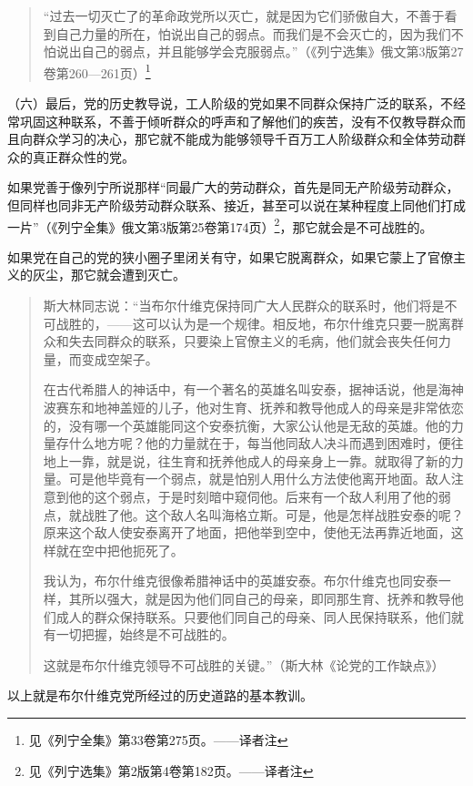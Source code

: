 \begin{quotation}
“过去一切灭亡了的革命政党所以灭亡，就是因为它们骄傲自大，不善于看到自己力量的所在，怕说出自己的弱点。而我们是不会灭亡的，因为我们不怕说出自己的弱点，并且能够学会克服弱点。”（《列宁选集》俄文第3版第27卷第260—261页）\footnote{见《列宁全集》第33卷第275页。——译者注}
\end{quotation}

（六）最后，党的历史教导说，工人阶级的党如果不同群众保持广泛的联系，不经常巩固这种联系，不善于倾听群众的呼声和了解他们的疾苦，没有不仅教导群众而且向群众学习的决心，那它就不能成为能够领导千百万工人阶级群众和全体劳动群众的真正群众性的党。

如果党善于像列宁所说那样“同最广大的劳动群众，首先是同无产阶级劳动群众，但同样也同非无产阶级劳动群众联系、接近，甚至可以说在某种程度上同他们打成一片”（《列宁全集》俄文第3版第25卷第174页）\footnote{见《列宁选集》第2版第4卷第182页。——译者注}，那它就会是不可战胜的。

如果党在自己的党的狭小圈子里闭关有守，如果它脱离群众，如果它蒙上了官僚主义的灰尘，那它就会遭到灭亡。

\begin{quotation}
斯大林同志说：“当布尔什维克保持同广大人民群众的联系时，他们将是不可战胜的，——这可以认为是一个规律。相反地，布尔什维克只要一脱离群众和失去同群众的联系，只要染上官僚主义的毛病，他们就会丧失任何力量，而变成空架子。

在古代希腊人的神话中，有一个著名的英雄名叫安泰，据神话说，他是海神波赛东和地神盖娅的儿子，他对生育、抚养和教导他成人的母亲是非常依恋的，没有哪一个英雄能同这个安泰抗衡，大家公认他是无敌的英雄。他的力量存什么地方呢？他的力量就在于，每当他同敌人决斗而遇到困难时，便往地上一靠，就是说，往生育和抚养他成人的母亲身上一靠。就取得了新的力量。可是他毕竟有一个弱点，就是怕别人用什么方法使他离开地面。敌人注意到他的这个弱点，于是时刻暗中窥伺他。后来有一个敌人利用了他的弱点，就战胜了他。这个敌人名叫海格立斯。可是，他是怎样战胜安泰的呢？原来这个敌人使安泰离开了地面，把他举到空中，使他无法再靠近地面，这样就在空中把他扼死了。

我认为，布尔什维克很像希腊神话中的英雄安泰。布尔什维克也同安泰一样，其所以强大，就是因为他们同自己的母亲，即同那生育、抚养和教导他们成人的群众保持联系。只要他们同自己的母亲、同人民保持联系，他们就有一切把握，始终是不可战胜的。

这就是布尔什维克领导不可战胜的关键。”（斯大林《论党的工作缺点》）
\end{quotation}

以上就是布尔什维克党所经过的历史道路的基本教训。

